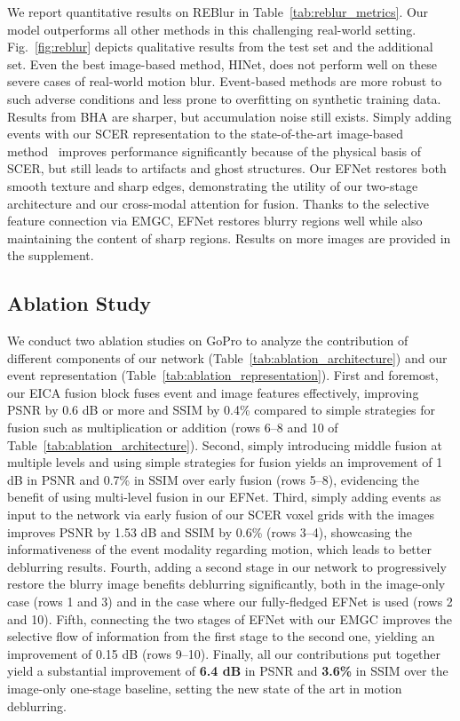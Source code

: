 \documentclass[runningheads]{llncs}
\newcommand{\PAR}[1]{\noindent{\bf #1}}
\newlength \g
\begin{document}
\PAR{REBlur dataset.}
We report quantitative results on REBlur in Table~\ref{tab:reblur_metrics}. Our model outperforms all other methods in this challenging real-world setting. Fig.~\ref{fig:reblur} depicts qualitative results from the test set and the additional set. Even the best image-based method, HINet, does not perform well on these severe cases of real-world motion blur. Event-based methods are more robust to such adverse conditions and less prone to overfitting on synthetic training data. Results from BHA are sharper, but accumulation noise still exists. Simply adding events with our SCER representation to the state-of-the-art image-based method~\cite{chen2021hinet} improves performance significantly because of the physical basis of SCER, but still leads to artifacts and ghost structures. Our EFNet restores both smooth texture and sharp edges, demonstrating the utility of our two-stage architecture and our cross-modal attention for fusion. Thanks to the selective feature connection via EMGC, EFNet restores blurry regions well while also maintaining the content of sharp regions. Results on more images are provided in the supplement.

\subsection{Ablation Study}

We conduct two ablation studies on GoPro to analyze the contribution of different components of our network (Table~\ref{tab:ablation_architecture}) and our event representation (Table~\ref{tab:ablation_representation}).
First and foremost, our EICA fusion block fuses event and image features effectively, improving PSNR by 0.6 dB or more and SSIM by 0.4\% compared to simple strategies for fusion such as multiplication or addition (rows 6--8 and 10 of Table~\ref{tab:ablation_architecture}). Second, simply introducing middle fusion at multiple levels and using simple strategies for fusion yields an improvement of 1 dB in PSNR and 0.7\% in SSIM over early fusion (rows 5--8), evidencing the benefit of using multi-level fusion in our EFNet. Third, simply adding events as input to the network via early fusion of our SCER voxel grids with the images improves PSNR by 1.53 dB and SSIM by 0.6\% (rows 3--4), showcasing the informativeness of the event modality regarding motion, which leads to better deblurring results. Fourth, adding a second stage in our network to progressively restore the blurry image benefits deblurring significantly, both in the image-only case (rows 1 and 3) and in the case where our fully-fledged EFNet is used (rows 2 and 10). Fifth, connecting the two stages of EFNet with our EMGC improves the selective flow of information from the first stage to the second one, yielding an improvement of 0.15 dB (rows 9--10). Finally, all our contributions put together yield a substantial improvement of \textbf{6.4 dB} in PSNR and \textbf{3.6\%} in SSIM over the image-only one-stage baseline, setting the new state of the art in motion deblurring.
\end{document}
